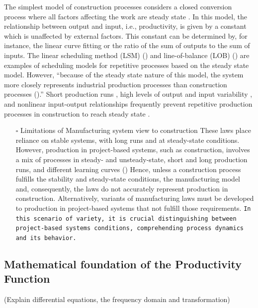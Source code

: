 \documentclass{article}
\begin{document}
The simplest model of construction processes considers a closed conversion process where all factors affecting the work are steady state \citep{Drewin1982}.
In this model, the relationship between output and input, i.e., productivity, is given by a constant which is unaffected by external factors.
This constant can be determined by, for instance, the linear curve fitting or the ratio of the sum of outputs to the sum of inputs.
The linear scheduling method (LSM) (\citep{Harmelink1998,Su2016}) and line-of-balance (LOB) (\citep{Lumsden1968,Su2016,ZolfagharDolabi2014}) are examples of scheduling models for repetitive processes based on the steady state model.
However, ``because of the steady state nature of this model, the system more closely represents industrial production processes than construction processes (\citep{Thomas1990}).''
Short production runs \citep{Bashford2005}, high levels of output and input variability \cite{Gonzalez2009}, and nonlinear input-output relationships \citep{Bertelsen2003,Lutz1993} frequently prevent repetitive production processes in construction to reach steady state \citep{Antunes2015a,Walsh2007}.


\begin{itemize}
\item[{$\square$}] Limitations of Manufacturing system view to construction
These laws place reliance on stable systems, with long runs and at steady-state conditions.
However, production in project-based systems, such as construction, involves a mix of processes in steady- and unsteady-state, short and long production runs, and different learning curves (\citep{Antunes2015})
Hence, unless a construction process fulfills the stability and steady-state conditions, the manufacturing model and, consequently, the laws do not accurately represent production in construction.
Alternatively, variants of manufacturing laws must be developed to production in project-based systems that not fulfill those requirements.
\texttt{In this scenario of variety, it is crucial distinguishing between project-based systems conditions, comprehending process dynamics and its behavior.}
\end{itemize}


\subsection{Mathematical foundation of the Productivity Function}
\label{sec:org50e188d}

(Explain differential equations, the frequency domain and transformation)
\end{document}
